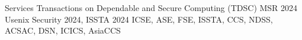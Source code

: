 
\begin{rubric}{Services}
	Transactions on Dependable and Secure Computing (TDSC)
	MSR 2024
	Usenix Security 2024, ISSTA 2024
        ICSE, ASE, FSE, ISSTA, CCS, NDSS, ACSAC, DSN, ICICS, AsiaCCS
\end{rubric}
